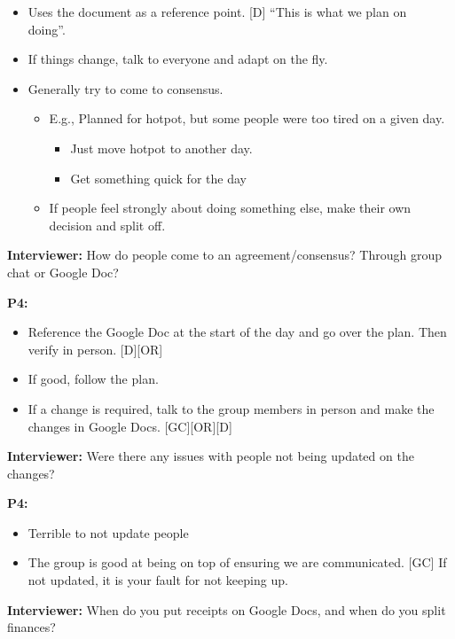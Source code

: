 \documentclass[12pt,a4paper]{article}
\begin{document}
\begin{itemize}
    \item Uses the document as a reference point. [D]
“This is what we plan on doing”.  

    \item If things change, talk to everyone and adapt on the fly. 
    \item Generally try to come to consensus. 
    \begin{itemize}
        \item E.g., Planned for hotpot, but some people were too tired on a given day. 
        \begin{itemize}
            \item Just move hotpot to another day. 
            \item Get something quick for the day
        \end{itemize}
        \item If people feel strongly about doing something else, make their own decision and split off. 
    \end{itemize}
\end{itemize}

\textbf{Interviewer: }How do people come to an agreement/consensus? Through group chat or Google Doc?   

\textbf{P4:}

\begin{itemize}
    \item Reference the Google Doc at the start of the day and go over the plan. Then verify in person. [D][OR]
    \item If good, follow the plan. 
    \item If a change is required, talk to the group members in person and make the changes in Google Docs. [GC][OR][D]
\end{itemize}

\textbf{Interviewer: }Were there any issues with people not being updated on the changes? 

\textbf{P4:}

\begin{itemize}
    \item Terrible to not update people 
    \item The group is good at being on top of ensuring we are communicated. [GC]
If not updated, it is your fault for not keeping up. 

\end{itemize}

\textbf{Interviewer: }When do you put receipts on Google Docs, and when do you split finances? 
\end{document}
